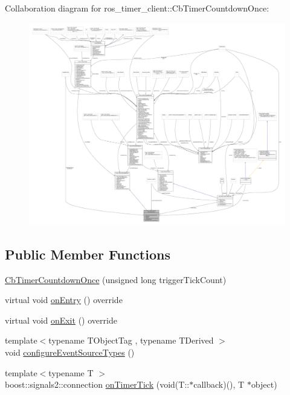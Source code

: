 Collaboration diagram for ros\+\_\+timer\+\_\+client\+:\+:Cb\+Timer\+Countdown\+Once\+:
\nopagebreak
\begin{figure}[H]
\begin{center}
\leavevmode
\includegraphics[width=350pt]{classros__timer__client_1_1CbTimerCountdownOnce__coll__graph}
\end{center}
\end{figure}
\subsection*{Public Member Functions}
\begin{DoxyCompactItemize}
\item 
\hyperlink{classros__timer__client_1_1CbTimerCountdownOnce_a11e7697b1f41c26b01132617de3fdf76}{Cb\+Timer\+Countdown\+Once} (unsigned long trigger\+Tick\+Count)
\item 
virtual void \hyperlink{classros__timer__client_1_1CbTimerCountdownOnce_a06e15530538aed6ff5b55e75fe979907}{on\+Entry} () override
\item 
virtual void \hyperlink{classros__timer__client_1_1CbTimerCountdownOnce_af2d3d5b803e19cd843db010d0406503a}{on\+Exit} () override
\item 
{\footnotesize template$<$typename T\+Object\+Tag , typename T\+Derived $>$ }\\void \hyperlink{classros__timer__client_1_1CbTimerCountdownOnce_afe77e4b3a1cb798651426da4a720cff4}{configure\+Event\+Source\+Types} ()
\item 
{\footnotesize template$<$typename T $>$ }\\boost\+::signals2\+::connection \hyperlink{classros__timer__client_1_1CbTimerCountdownOnce_a38949571cf20ca88b4a1bac881399f21}{on\+Timer\+Tick} (void(T\+::$\ast$callback)(), T $\ast$object)
\end{DoxyCompactItemize}
